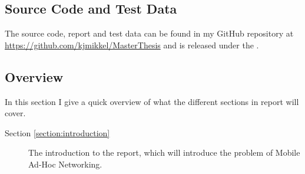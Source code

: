 \subsection{Source Code and Test Data}
The source code, report and test data can be found in my GitHub repository at \url{https://github.com/kjmikkel/MasterThesis} and is released under the .

\subsection{Overview}
In this section I give a quick overview of what the different sections in report will cover.
\begin{description}
\item[Section \ref{section:introduction}] The introduction to the report, which will introduce the problem of Mobile Ad-Hoc Networking.
\item[]
\end{description}
